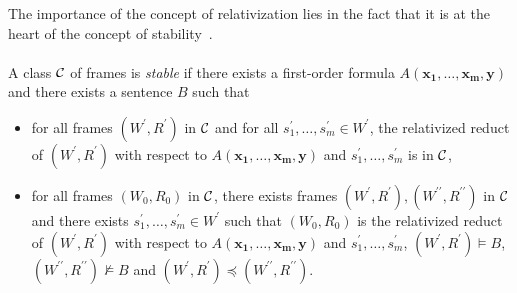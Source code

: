 \documentclass[draft]{article}
\newtheorem{proposition}{Proposition}
\begin{document}
%
%
%
%
%
%
%
%
%
%
%
%
%
%
The importance of the concept of relativization lies in the fact that it is at the heart of the concept of stability~\cite{Balbiani:Tinchev:2017,Balbiani:Tinchev:2019}.
%
%
\\
\\
%
%
A class ${\cal C}$ of frames is {\it stable}\/ if there exists a first-order formula $A(\mathbf{x_{1}},\ldots,\mathbf{x_{m}},\mathbf{y})$ and there exists a sentence $B$ such that
%
%
\begin{itemize}
%
%
\item for all frames $(W^{\prime},R^{\prime})$ in ${\cal C}$ and for all $s^{\prime}_{1},\ldots,s^{\prime}_{m}{\in}W^{\prime}$, the relativized reduct of $(W^{\prime},R^{\prime})$ with respect to $A(\mathbf{x_{1}},\ldots,\mathbf{x_{m}},\mathbf{y})$ and $s^{\prime}_{1},\ldots,s^{\prime}_{m}$ is in ${\cal C}$,
%
\item for all frames $(W_{0},R_{0})$ in ${\cal C}$, there exists frames $(W^{\prime},R^{\prime}),(W^{\prime\prime},R^{\prime\prime})$ in ${\cal C}$ and there exists $s^{\prime}_{1},\ldots,s^{\prime}_{m}{\in}W^{\prime}$ such that $(W_{0},R_{0})$ is the relativized reduct of $(W^{\prime},R^{\prime})$ with respect to $A(\mathbf{x_{1}},\ldots,\mathbf{x_{m}},\mathbf{y})$ and $s^{\prime}_{1},\ldots,s^{\prime}_{m}$, $(W^{\prime},R^{\prime})\models B$, $(W^{\prime\prime},R^{\prime\prime})\not\models B$ and $(W^{\prime},R^{\prime})\preceq(W^{\prime\prime},R^{\prime\prime})$.
%
%
\end{itemize}
\end{document}
